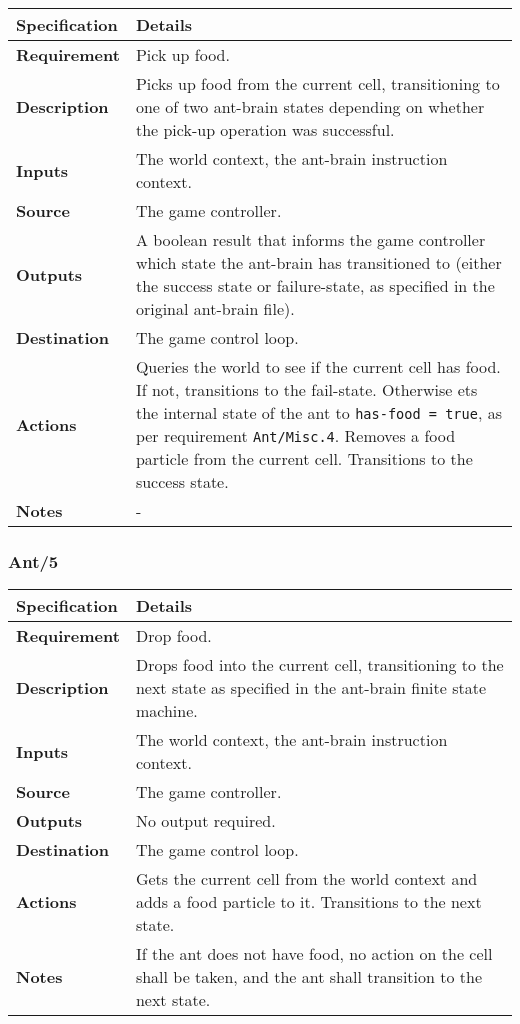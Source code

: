 \documentclass[11pt]{article}
\begin{document}
\begin{longtable}[c]{@{\extracolsep{\fill}}|p{}|p{}|@{}}
\hline
Specification & Details\tabularnewline
\hline

\textbf{Requirement} & Pick up food.\tabularnewline
\textbf{Description} & Picks up food from the current cell,
transitioning to one of two ant-brain states depending on whether the
pick-up operation was successful.\tabularnewline
\textbf{Inputs} & The world context, the ant-brain instruction
context.\tabularnewline
\textbf{Source} & The game controller.\tabularnewline
\textbf{Outputs} & A boolean result that informs the game controller
which state the ant-brain has transitioned to (either the success state
or failure-state, as specified in the original ant-brain
file).\tabularnewline
\textbf{Destination} & The game control loop.\tabularnewline
\textbf{Actions} & Queries the world to see if the current cell has
food. If not, transitions to the fail-state. Otherwise ets the internal
state of the ant to \texttt{has-food\ =\ true}, as per requirement
\texttt{Ant/Misc.4}. Removes a food particle from the current cell.
Transitions to the success state.\tabularnewline
\textbf{Notes} & -\tabularnewline
\hline
\end{longtable}

\subsubsection*{Ant/5}\label{ant5}

\begin{longtable}[c]{@{\extracolsep{\fill}}|p{}|p{}|@{}}
\hline
Specification & Details\tabularnewline
\hline

\textbf{Requirement} & Drop food.\tabularnewline
\textbf{Description} & Drops food into the current cell, transitioning
to the next state as specified in the ant-brain finite state
machine.\tabularnewline
\textbf{Inputs} & The world context, the ant-brain instruction
context.\tabularnewline
\textbf{Source} & The game controller.\tabularnewline
\textbf{Outputs} & No output required.\tabularnewline
\textbf{Destination} & The game control loop.\tabularnewline
\textbf{Actions} & Gets the current cell from the world context and adds
a food particle to it. Transitions to the next state.\tabularnewline
\textbf{Notes} & If the ant does not have food, no action on the cell
shall be taken, and the ant shall transition to the next
state.\tabularnewline
\hline
\end{longtable}
\end{document}
